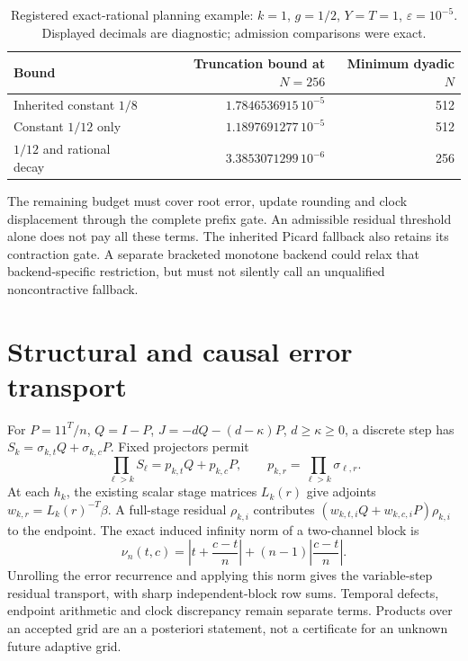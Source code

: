 \documentclass[aps,pra,reprint,onecolumn,11pt,notitlepage,nofootinbib]{revtex4-2}
\newcommand{\eps}{\varepsilon}
\begin{document}
\begin{table}[h]
\caption{Registered exact-rational planning example:
$k=1$, $g=1/2$, $Y=T=1$, $\eps=10^{-5}$. Displayed decimals are diagnostic;
admission comparisons were exact.}
\begin{tabular}{lrr}
\toprule
Bound & Truncation bound at $N=256$ & Minimum dyadic $N$\\
\midrule
Inherited constant $1/8$ & $1.7846536915\,10^{-5}$ & 512\\
Constant $1/12$ only & $1.1897691277\,10^{-5}$ & 512\\
$1/12$ and rational decay & $3.3853071299\,10^{-6}$ & 256\\
\bottomrule
\end{tabular}
\end{table}

The remaining budget must cover root error, update rounding and clock
displacement through the complete prefix gate. An admissible residual
threshold alone does not pay all these terms. The inherited Picard fallback
also retains its contraction gate. A separate bracketed monotone backend
could relax that backend-specific restriction, but must not silently call
an unqualified noncontractive fallback.

\section{Structural and causal error transport}
For $P=11^T/n$, $Q=I-P$, $J=-dQ-(d-\kappa)P$, $d\ge\kappa\ge0$, a discrete
step has $S_k=\sigma_{k,t}Q+\sigma_{k,c}P$. Fixed projectors permit
\begin{equation}
 \prod_{\ell>k}S_\ell=p_{k,t}Q+p_{k,c}P,
 \qquad p_{k,r}=\prod_{\ell>k}\sigma_{\ell,r}.
\end{equation}
At each $h_k$, the existing scalar stage matrices $L_k(r)$ give adjoints
$w_{k,r}=L_k(r)^{-T}\beta$. A full-stage residual $\rho_{k,i}$ contributes
$(w_{k,t,i}Q+w_{k,c,i}P)\rho_{k,i}$ to the endpoint. The exact induced
infinity norm of a two-channel block is
\begin{equation}
 \nu_n(t,c)=\left|t+\frac{c-t}{n}\right|
       +(n-1)\left|\frac{c-t}{n}\right|.
\end{equation}
Unrolling the error recurrence and applying this norm gives the
variable-step residual transport, with sharp independent-block row sums.
Temporal defects, endpoint arithmetic and clock discrepancy remain separate
terms. Products over an accepted grid are an a posteriori statement, not a
certificate for an unknown future adaptive grid.
\end{document}
